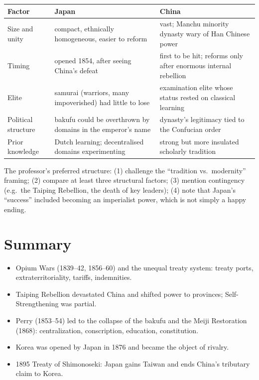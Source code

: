\begin{center}
\begin{tabular}{p{3.6cm}p{4.6cm}p{4.6cm}}
\toprule
Factor & Japan & China \\
\midrule
Size and unity & compact, ethnically homogeneous, easier to reform & vast; Manchu minority dynasty wary of Han Chinese power \\
Timing & opened 1854, after seeing China's defeat & first to be hit; reforms only after enormous internal rebellion \\
Elite & samurai (warriors, many impoverished) had little to lose & examination elite whose status rested on classical learning \\
Political structure & bakufu could be overthrown by domains in the emperor's name & dynasty's legitimacy tied to the Confucian order \\
Prior knowledge & Dutch learning; decentralised domains experimenting & strong but more insulated scholarly tradition \\
\bottomrule
\end{tabular}
\end{center}

\begin{important}
The professor's preferred structure: (1) challenge the ``tradition vs.\ modernity''
framing; (2) compare at least three structural factors; (3) mention contingency (e.g.\ the
Taiping Rebellion, the death of key leaders); (4) note that Japan's ``success'' included
becoming an imperialist power, which is not simply a happy ending.
\end{important}

\section*{Summary}
\begin{itemize}
  \item Opium Wars (1839--42, 1856--60) and the unequal treaty system: treaty ports,
        extraterritoriality, tariffs, indemnities.
  \item Taiping Rebellion devastated China and shifted power to provinces;
        Self-Strengthening was partial.
  \item Perry (1853--54) led to the collapse of the bakufu and the Meiji Restoration (1868):
        centralization, conscription, education, constitution.
  \item Korea was opened by Japan in 1876 and became the object of rivalry.
  \item 1895 Treaty of Shimonoseki: Japan gains Taiwan and ends China's tributary claim to
        Korea.
\end{itemize}
